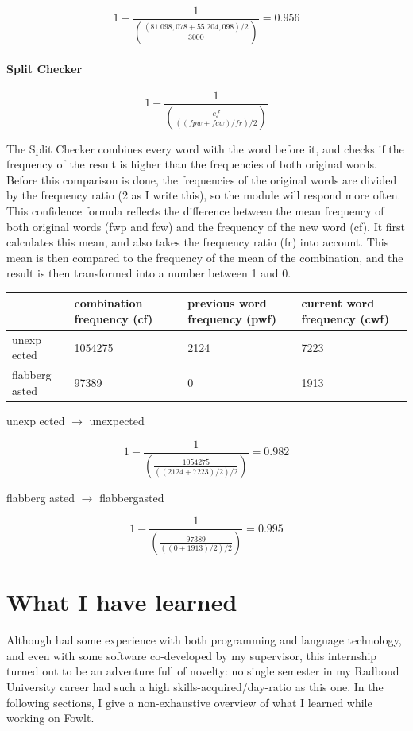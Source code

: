 \documentclass[12pt]{article}
\let\stdsection\section
\renewcommand\section{\newpage\stdsection}
\begin{document}
\[
1 - \frac{1}{(\frac{(81.098,078+55.204,098)/2}{3000})} = 0.956
\]

\paragraph{Split Checker}

\[
1 - \frac{1}{(\frac{cf}{((fpw+fcw)/fr)/2})}
\]

The Split Checker combines every word with the word before it, and checks if the frequency of the result is higher than the frequencies of both original words. Before this comparison is done, the frequencies of the original words are divided by the frequency ratio (2 as I write this), so the module will respond more often. This confidence formula reflects the difference between the mean frequency of both original words (fwp and fcw) and the frequency of the new word (cf). It first calculates this mean, and also takes the frequency ratio (fr) into account. This mean is then compared to the frequency of the mean of the combination, and the result is then transformed into a number between 1 and 0.

\begin{table}[h]\footnotesize
\begin{tabular}{|l|lll|}
\hline
&combination frequency (cf)&previous word frequency (pwf)&current word frequency (cwf)\\ 
\hline
unexp ected&1054275&2124&7223\\
flabberg asted&97389&0&1913\\
\hline
\end{tabular}
\end{table}

unexp ected $\rightarrow$ unexpected

\[
1 - \frac{1}{(\frac{1054275}{((2124+7223)/2)/2})} = 0.982
\]

flabberg asted $\rightarrow$ flabbergasted

\[
1 - \frac{1}{(\frac{97389}{((0+1913)/2)/2})} = 0.995
\]


\section{What I have learned}
Although had some experience with both programming and language technology, and even with some software co-developed by my supervisor, this internship turned out to be an adventure full of novelty: no single semester in my Radboud University career had such a high skills-acquired/day-ratio as this one. In the following sections, I give a non-exhaustive overview of what I learned while working on Fowlt.
\end{document}
